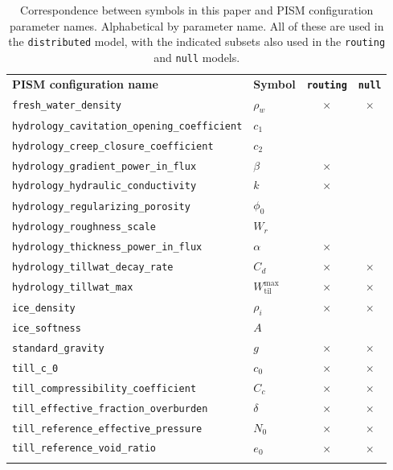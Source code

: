 \documentclass[gmd]{copernicus}   %
\newcommand{\text}{\textrm}
\newcommand{\Wtilmax}{W_{\text{til}}^{\text{max}}}
\begin{document}
\begin{table}[t]
  \caption{Correspondence between symbols in this paper and PISM configuration parameter names.  Alphabetical by parameter name.  All of these are used in the \texttt{distributed} model, with the indicated subsets also used in the \texttt{routing} and \texttt{null} models.} \vskip4mm \centering
  \begin{tabular}{llcc} \tophline
    \textbf{PISM configuration name} & \textbf{Symbol} & \textbf{\texttt{routing}} & \textbf{\texttt{null}} \\
    \middlehline
    \verb|fresh_water_density| & $\rho_w$ & $\times$ & $\times$ \\
    \verb|hydrology_cavitation_opening_coefficient| & $c_1$ \\
    \verb|hydrology_creep_closure_coefficient| & $c_2$ \\
    \verb|hydrology_gradient_power_in_flux| &  $\beta$ & $\times$ & \\
    \verb|hydrology_hydraulic_conductivity| & $k$ & $\times$ & \\
    \verb|hydrology_regularizing_porosity| & $\phi_0$ \\
    \verb|hydrology_roughness_scale| & $W_r$ \\
    \verb|hydrology_thickness_power_in_flux| &  $\alpha$ & $\times$ & \\
    \verb|hydrology_tillwat_decay_rate| & $C_d$ & $\times$ & $\times$ \\
    \verb|hydrology_tillwat_max| & $\Wtilmax$ & $\times$ & $\times$ \\
    \verb|ice_density| & $\rho_i$ & $\times$ & $\times$ \\
    \verb|ice_softness| & $A$ \\
    \verb|standard_gravity| & $g$ & $\times$ & $\times$ \\
    \verb|till_c_0| & $c_0$ & $\times$ & $\times$ \\
    \verb|till_compressibility_coefficient| & $C_c$ & $\times$ & $\times$ \\
    \verb|till_effective_fraction_overburden| & $\delta$ & $\times$ & $\times$ \\
    \verb|till_reference_effective_pressure| & $N_0$ & $\times$ & $\times$ \\
    \verb|till_reference_void_ratio| & $e_0$ & $\times$ & $\times$ \\
    \bottomhline
  \end{tabular}
  \label{tab:correspondence}
\end{table}
\end{document}
